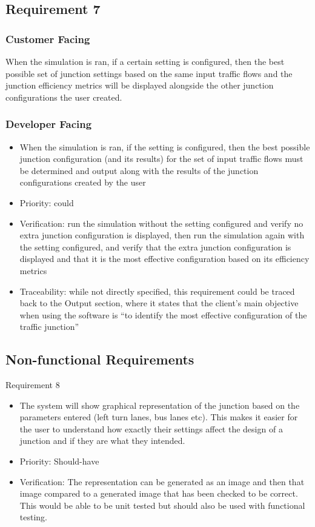 \documentclass{article}
\begin{document}
\subsection{Requirement 7}
\subsubsection{Customer Facing}
When the simulation is ran, if a certain setting is configured, then the best 
possible set of junction settings based on the same input traffic flows and the 
junction efficiency metrics will be displayed alongside the other junction 
configurations the user created.
\subsubsection{Developer Facing}
\begin{itemize}
  \item When the simulation is ran, if the setting is configured, then the best 
  possible junction configuration (and its results) for the set of input traffic 
  flows must be determined and output along with the results of the junction 
  configurations created by the user
  \item Priority: could
  \item Verification: run the simulation without the setting configured and verify 
  no extra junction configuration is displayed, then run the simulation again with 
  the setting configured, and verify that the extra junction configuration is displayed 
  and that it is the most effective configuration based on its efficiency metrics
  \item Traceability: while not directly specified, this requirement could be traced back 
  to the Output section, where it states that the client’s main objective when using 
  the software is “to identify the most effective configuration of the traffic junction”
\end{itemize}

\subsection{Non-functional Requirements}
Requirement 8
\begin{itemize}
  \item The system will show graphical representation of the junction based on the parameters entered (left turn lanes, bus lanes etc). This makes it easier for the user to understand how exactly their settings affect the design of a junction and if they are what they intended.
  \item Priority: Should-have 
  \item Verification: The representation can be generated as an image and then that image compared to a generated image that has been checked to be correct. This would be able to be unit tested but should also be used  with functional testing.
\end{itemize}
\end{document}
